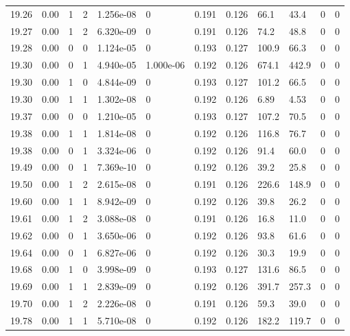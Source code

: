 \documentclass[preview]{standalone}
\begin{document}
{{{{{{{{{{{{{{{\begin{tabular}{L{1.2cm}C{1.2cm} C{0.3cm}C{0.5cm} C{1.4cm}C{1.4cm} C{1.4cm}C{1.4cm} C{1.6cm}C{1.6cm} C{1.6cm}C{1.6cm}}
  19.26  &  0.00  & 1     &  2 &  1.256e-08  & 0  &  0.191&   0.126& 66.1 & 43.4   &  0 & 0  \\ 
  19.27  &  0.00  & 1     &  2 &  6.320e-09  & 0  &  0.191&   0.126& 74.2 & 48.8   &  0 & 0  \\ 
  19.28  &  0.00  & 0     &  0 &  1.124e-05  & 0  &  0.193&   0.127& 100.9 & 66.3   &  0 & 0  \\ 
  19.30  &  0.00  & 0     &  1 &  4.940e-05  & 1.000e-06  &  0.192&   0.126& 674.1 & 442.9   &  0 & 0  \\ 
  19.30  &  0.00  & 1     &  0 &  4.844e-09  & 0  &  0.193&   0.127& 101.2 & 66.5   &  0 & 0  \\ 
  19.30  &  0.00  & 1     &  1 &  1.302e-08  & 0  &  0.192&   0.126& 6.89 & 4.53   &  0 & 0  \\ 
  19.37  &  0.00  & 0     &  0 &  1.210e-05  & 0  &  0.193&   0.127& 107.2 & 70.5   &  0 & 0  \\ 
  19.38  &  0.00  & 1     &  1 &  1.814e-08  & 0  &  0.192&   0.126& 116.8 & 76.7   &  0 & 0  \\ 
  19.38  &  0.00  & 0     &  1 &  3.324e-06  & 0  &  0.192&   0.126& 91.4 & 60.0   &  0 & 0  \\ 
  19.49  &  0.00  & 0     &  1 &  7.369e-10  & 0  &  0.192&   0.126& 39.2 & 25.8   &  0 & 0  \\ 
  19.50  &  0.00  & 1     &  2 &  2.615e-08  & 0  &  0.191&   0.126& 226.6 & 148.9   &  0 & 0  \\ 
  19.60  &  0.00  & 1     &  1 &  8.942e-09  & 0  &  0.192&   0.126& 39.8 & 26.2   &  0 & 0  \\ 
  19.61  &  0.00  & 1     &  2 &  3.088e-08  & 0  &  0.191&   0.126& 16.8 & 11.0   &  0 & 0  \\ 
  19.62  &  0.00  & 0     &  1 &  3.650e-06  & 0  &  0.192&   0.126& 93.8 & 61.6   &  0 & 0  \\ 
  19.64  &  0.00  & 0     &  1 &  6.827e-06  & 0  &  0.192&   0.126& 30.3 & 19.9   &  0 & 0  \\ 
  19.68  &  0.00  & 1     &  0 &  3.998e-09  & 0  &  0.193&   0.127& 131.6 & 86.5   &  0 & 0  \\ 
  19.69  &  0.00  & 1     &  1 &  2.839e-09  & 0  &  0.192&   0.126& 391.7 & 257.3   &  0 & 0  \\ 
  19.70  &  0.00  & 1     &  2 &  2.226e-08  & 0  &  0.191&   0.126& 59.3 & 39.0   &  0 & 0  \\ 
  19.78  &  0.00  & 1     &  1 &  5.710e-08  & 0  &  0.192&   0.126& 182.2 & 119.7   &  0 & 0  \\ 

\end{tabular}}}}}}}}}}}}}}}}
\end{document}
